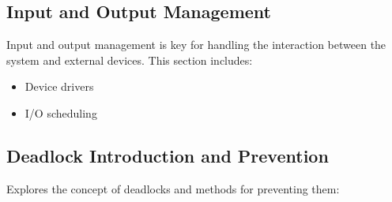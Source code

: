 \documentclass[12pt]{article}
\begin{document}
\subsection{Input and Output Management}
Input and output management is key for handling the interaction between the system and external devices. This section includes:
\begin{itemize}
    \item Device drivers
    \item I/O scheduling
\end{itemize}

\subsection{Deadlock Introduction and Prevention}
Explores the concept of deadlocks and methods for preventing them:
\end{document}
